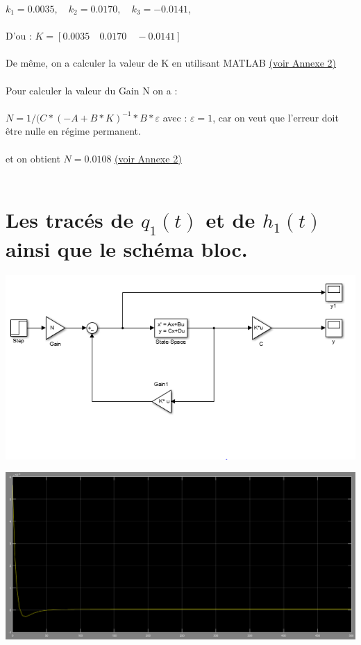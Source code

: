 $k_{1}=0.0035  ,\quad k_{2}=0.0170  ,\quad k_{3}=-0.0141  $, \\\\

D'ou : $K=[0.0035 \quad 0.0170  \quad -0.0141]$\\\\

De même, on a calculer la valeur de K en utilisant MATLAB \hyperref[section1.2]{(voir Annexe 2)}\label{annexe2}\\\\

Pour calculer la valeur du Gain N on a :\\\\

$N=1/(C*(-A+B*K)^{-1}*B*\varepsilon $ \quad avec : $\varepsilon=1$, car on veut que l'erreur doit être nulle en régime permanent. \\\\

et on obtient $N=0.0108$ \quad \hyperref[section1.2]{(voir Annexe 2)}\label{annexe2}\\\\

\section{Les tracés de $q_{1}(t)$ et de $h _{1}(t)$ ainsi que le schéma bloc.}




\begin{center}
\includegraphics[scale=0.7]{schemabloc1.PNG}
\label{fig1} 
\end{center} 

\begin{center}
\includegraphics[scale=0.4]{q1(t).PNG}
\label{fig1} 
\end{center} 

